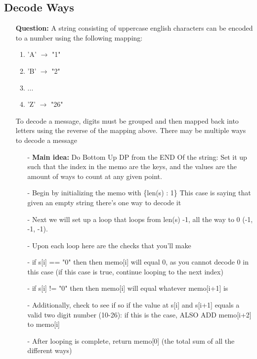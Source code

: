 \documentclass[12pt]{article}
\begin{document}
\subsection{Decode Ways}
\begin{enumerate}
  \item[] \textbf{Question:} A string consisting of uppercase english characters can be encoded to a number using the following mapping:
  
    \begin{enumerate}
      \item'A' $\to$ "1"
      \item'B' $\to$ "2"
      \item ...
      \item'Z' $\to$ "26"
    \end{enumerate}
To decode a message, digits must be grouped and then mapped back into letters using the reverse of the mapping above. There may be multiple ways to decode a message

    \begin{enumerate}
      \item[-] \textbf{Main idea:} Do Bottom Up DP from the END Of the string: Set it up such that the index in the memo are the keys, and the values are the amount of ways to count at any given point.
      \item[-] Begin by initializing the memo with \{len(s) : 1\} This case is saying that given an empty string there's one way to decode it
      \item[-] Next we will set up a loop that loops from len(s) -1, all the way to 0 (-1, -1, -1). 
      \item[-] Upon each loop here are the checks that you'll make
      \item[-] if s[i] == "0" then then memo[i] will equal 0, as you cannot decode 0 in this case (if this case is true, continue looping to the next index)
      \item[-] if s[i] != "0" then then memo[i] will equal whatever memo[i+1] is
      \item[-] Additionally, check to see if so if the value at s[i] and s[i+1] equals a valid two digit number (10-26): if this is the case, ALSO ADD memo[i+2] to memo[i]
      \item[-] After looping is complete, return memo[0] (the total sum of all the different ways)
    \end{enumerate}
\end{enumerate}
\end{document}
